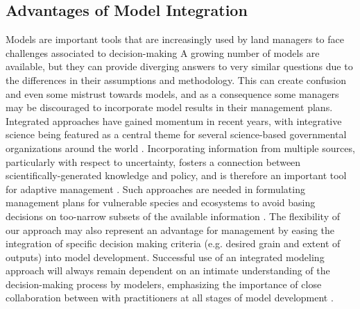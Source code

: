 \documentclass[11pt]{article}
\begin{document}

\subsection*{Advantages of Model Integration}
Models are important tools that are increasingly used by land managers to face challenges associated to decision-making \citep{Guisan2013}
A growing number of models are available, but they can provide diverging answers to very similar questions due to the differences in their assumptions and methodology. 
This can create confusion and even some mistrust towards models, and as a consequence some managers may be discouraged to incorporate model results in their management plans. 
Integrated approaches have gained momentum in recent years, with integrative science being featured as a central theme for several science-based governmental organizations around the world \citep[e.g.,][]{Bernier2013}. 
Incorporating information from multiple sources, particularly with respect to uncertainty,  fosters a connection between scientifically-generated knowledge and policy, and is therefore an important tool for adaptive management \citep[][Fig. \ref{fig:management}]{Rehme2011}.
Such approaches are needed in formulating management plans for vulnerable species and ecosystems to avoid basing decisions on too-narrow subsets of the available information \citep{Dawson2011}.
The flexibility of our approach may also represent an advantage for management by easing the integration of specific decision making criteria (e.g. desired grain and extent of outputs) into model development. 
Successful use of an integrated modeling approach will always remain dependent on an intimate understanding of the decision-making process by modelers, emphasizing the importance of close collaboration between with practitioners at all stages of model development \citep{Guisan2013}.
\end{document}
